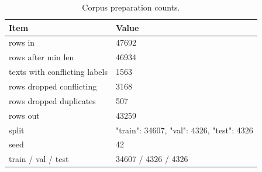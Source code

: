 \begin{table}[t]
\centering
\caption{Corpus preparation counts.}
\label{tab:dataset}
\begin{tabular}{ll}
\toprule
Item & Value \\
\midrule
rows in & 47692 \\
rows after min len & 46934 \\
texts with conflicting labels & 1563 \\
rows dropped conflicting & 3168 \\
rows dropped duplicates & 507 \\
rows out & 43259 \\
split & {"train": 34607, "val": 4326, "test": 4326} \\
seed & 42 \\
train / val / test & 34607 / 4326 / 4326 \\
\bottomrule
\end{tabular}
\end{table}